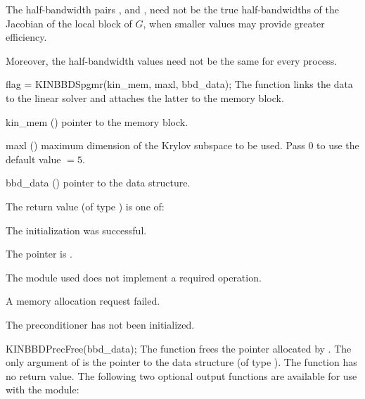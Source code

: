 {
  The half-bandwidth pairs , and , need
  not be the true half-bandwidths of the Jacobian of the local block of $G$,    
  when smaller values may provide greater efficiency.       

  Moreover, the half-bandwidth values need not be the same for every process.
}
{
  flag = KINBBDSpgmr(kin\_mem, maxl, bbd\_data);
}
{
  The function  links the {\kinbbdpre} data to the
  {\kinspgmr} linear solver and attaches the latter to the {\kinsol}
  memory block.
}
{
  \begin{args}
  \item[kin\_mem] ()
    pointer to the {\kinsol} memory block.
  \item[maxl] ()
    maximum dimension of the Krylov subspace to be used. Pass $0$ to use the 
    default value $=5$.
  \item[bbd\_data] ()
    pointer to the {\kinbbdpre} data structure.
  \end{args}
}
{
  The return value  (of type ) is one of:
  \begin{args}
  \item[\Id{KINSPGMR\_SUCCESS}] 
    The {\kinspgmr} initialization was successful.
  \item[\Id{KINSPGMR\_MEM\_NULL}]
    The  pointer is .
  \item[\Id{KINSPGMR\_ILL\_INPUT}]
    The {\nvector} module used does not implement a required operation.
  \item[\Id{KINSPGMR\_MEM\_FAIL}]
    A memory allocation request failed.
  \item[\Id{KIN\_PDATA\_NULL}]
    The {\kinbbdpre} preconditioner has not been initialized.
  \end{args}
}
{}
{
  KINBBDPrecFree(bbd\_data);
}
{
  The function  frees the pointer allocated by
  .
}
{
  The only argument of  is the pointer to the {\kinbbdpre} 
  data structure (of type ).
}
{
  The function  has no return value.
}
{}
The following two optional output functions are available for use with
the {\kinbbdpre} module:
